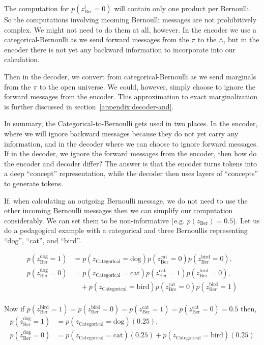 \documentclass{article}
\begin{document}
The computation for $p(z^{i}_{\text{Ber}}=0)$ will contain only one product per Bernoulli.  So the computations involving incoming Bernoulli messages are not prohibitively complex. We might not need to do them at all, however.  In the encoder we use a categorical-Bernoulli as we send forward messages from the $\pi$ to the $\land$, but in the encoder there is not yet any backward information to incorporate into our calculation.

Then in the decoder, we convert from categorical-Bernoulli as we send marginals from the $\pi$ to the open universe.  We could, however, simply choose to ignore the forward messages from the encoder.  This approximation to exact marginalization is further discussed in section~\ref{appendix:decoder-and}.

In summary, the Categorical-to-Bernoulli gets used in two places.  In the encoder, where we will ignore backward messages because they do not yet carry any information, and in the decoder where we can choose to ignore forward messages. If in the decoder, we ignore the forward messages from the encoder, then how do the encoder and decoder differ?  The answer is that the encoder turns tokens into a deep ``concept'' representation, while the decoder then uses layers of ``concepts'' to generate tokens.

If, when calculating an outgoing Bernoulli message, we do not need to use the other incoming Bernoulli messages then we can simplify our computation considerably.  We can set them to be non-informative (e.g. $p(z_{\text{Ber}})=0.5$).  Let us do a pedagogical example with a categorical and three Bernoullis representing ``dog'', ``cat'', and ``bird''.

\begin{align}
    p({z^{\text{dog}}_{\text{Ber}}}=1) 
    &= 
    p(z_{\text{Categorical}}=\text{dog})
    p({z^{\text{cat}}_{\text{Ber}}}=0)
    p({z^{\text{bird}}_{\text{Ber}}}=0), \\
    p({z^{\text{dog}}_{\text{Ber}}}=0)
    &= p(z_{\text{Categorical}}=\text{cat})
    p({z^{\text{cat}}_{\text{Ber}}}=1)
    p({z^{\text{bird}}_{\text{Ber}}}=0), \nonumber \\
    &\quad+ p(z_{\text{Categorical}}=\text{bird})
    p({z^{\text{cat}}_{\text{Ber}}}=0)
    p({z^{\text{bird}}_{\text{Ber}}}=1)
\end{align}\\

Now if $p({z^{\text{bird}}_{\text{Ber}}}=1) = p({z^{\text{bird}}_{\text{Ber}}}=0) = p({z^{\text{cat}}_{\text{Ber}}}=1) = p({z^{\text{cat}}_{\text{Ber}}}=0) = 0.5$ then,\\
\begin{align}
    p({z^{\text{dog}}_{\text{Ber}}}=1) 
    &= 
    p(z_{\text{Categorical}}=\text{dog})(0.25), \\
    p({z^{\text{dog}}_{\text{Ber}}}=0)
    &= p(z_{\text{Categorical}}=\text{cat})(0.25) + p(z_{\text{Categorical}}=\text{bird})(0.25)
\end{align}
\end{document}
